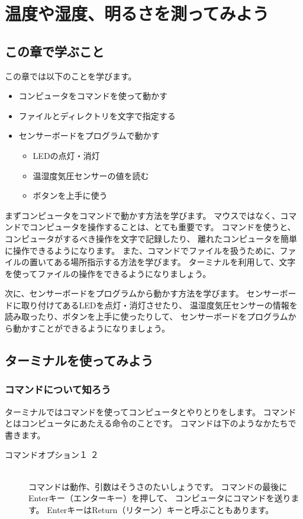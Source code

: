 \chapter{温度や湿度、明るさを測ってみよう}
\section{この章で学ぶこと}
この章では以下のことを学びます。

\begin{itemize}
  \item コンピュータをコマンドを使って動かす
  \item ファイルとディレクトリを文字で指定する
  \item センサーボードをプログラムで動かす
  \begin{itemize}
    \item LEDの点灯・消灯
    \item 温湿度気圧センサーの値を読む
    \item ボタンを上手に使う
  \end{itemize}
\end{itemize}

まずコンピュータをコマンドで動かす方法を学びます。
マウスではなく、コマンドでコンピュータを操作することは、とても重要です。
コマンドを使うと、コンピュータがするべき操作を文字で記録したり、
離れたコンピュータを簡単に操作できるようになります。
また、コマンドでファイルを扱うために、ファイルの置いてある場所指示する方法を学びます。
ターミナルを利用して、文字を使ってファイルの操作をできるようになりましょう。

次に、センサーボードをプログラムから動かす方法を学びます。
センサーボードに取り付けてあるLEDを点灯・消灯させたり、
温湿度気圧センサーの情報を読み取ったり、ボタンを上手に使ったりして、
センサーボードをプログラムから動かすことができるようになりましょう。

\section{ターミナルを使ってみよう}
\subsection{コマンドについて知ろう}

ターミナルではコマンドを使ってコンピュータとやりとりをします。
コマンドとはコンピュータにあたえる命令のことです。
コマンドは下のようなかたちで書きます。

\begin{description}
\item[コマンド\textvisiblespace オプション\textvisiblespace {}１\textvisiblespace 
{}２]\mbox{}\\
 コマンドは動作、引数はそうさのたいしょうです。
 コマンドの最後にEnterキー（エンターキー）を押して、
 コンピュータにコマンドを送ります。
 EnterキーはReturn（リターン）キーと呼ぶこともあります。
\end{description}

